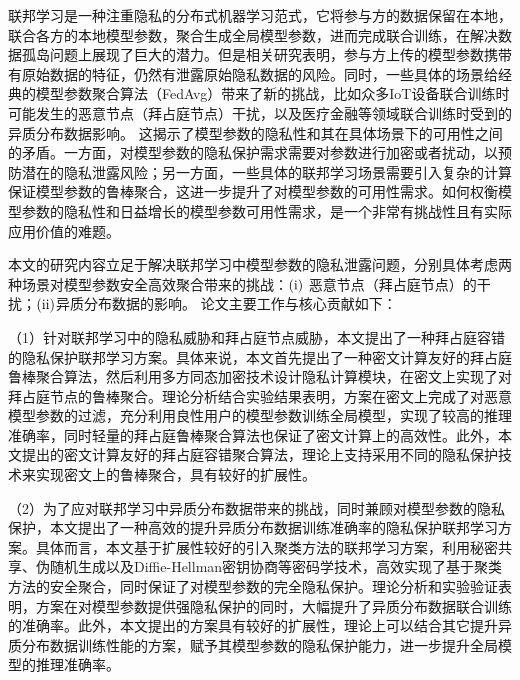 \begin{cabstract}
联邦学习是一种注重隐私的分布式机器学习范式，它将参与方的数据保留在本地，联合各方的本地模型参数，聚合生成全局模型参数，进而完成联合训练，在解决数据孤岛问题上展现了巨大的潜力。但是相关研究表明，参与方上传的模型参数携带有原始数据的特征，仍然有泄露原始隐私数据的风险。同时，一些具体的场景给经典的模型参数聚合算法（FedAvg）带来了新的挑战，比如众多IoT设备联合训练时可能发生的恶意节点（拜占庭节点）干扰，以及医疗金融等领域联合训练时受到的异质分布数据影响。
这揭示了模型参数的隐私性和其在具体场景下的可用性之间的矛盾。一方面，对模型参数的隐私保护需求需要对参数进行加密或者扰动，以预防潜在的隐私泄露风险；另一方面，一些具体的联邦学习场景需要引入复杂的计算保证模型参数的鲁棒聚合，这进一步提升了对模型参数的可用性需求。如何权衡模型参数的隐私性和日益增长的模型参数可用性需求，是一个非常有挑战性且有实际应用价值的难题。

本文的研究内容立足于解决联邦学习中模型参数的隐私泄露问题，分别具体考虑两种场景对模型参数安全高效聚合带来的挑战：$(\rm \romannumeral1)$ 恶意节点（拜占庭节点）的干扰；$(\rm \romannumeral2)$异质分布数据的影响。
论文主要工作与核心贡献如下：

（1）针对联邦学习中的隐私威胁和拜占庭节点威胁，本文提出了一种拜占庭容错的隐私保护联邦学习方案。具体来说，本文首先提出了一种密文计算友好的拜占庭鲁棒聚合算法，然后利用多方同态加密技术设计隐私计算模块，在密文上实现了对拜占庭节点的鲁棒聚合。理论分析结合实验结果表明，方案在密文上完成了对恶意模型参数的过滤，充分利用良性用户的模型参数训练全局模型，实现了较高的推理准确率，同时轻量的拜占庭鲁棒聚合算法也保证了密文计算上的高效性。此外，本文提出的密文计算友好的拜占庭容错聚合算法，理论上支持采用不同的隐私保护技术来实现密文上的鲁棒聚合，具有较好的扩展性。

（2）为了应对联邦学习中异质分布数据带来的挑战，同时兼顾对模型参数的隐私保护，本文提出了一种高效的提升异质分布数据训练准确率的隐私保护联邦学习方案。具体而言，本文基于扩展性较好的引入聚类方法的联邦学习方案，利用秘密共享、伪随机生成以及Diffie-Hellman密钥协商等密码学技术，高效实现了基于聚类方法的安全聚合，同时保证了对模型参数的完全隐私保护。理论分析和实验验证表明，方案在对模型参数提供强隐私保护的同时，大幅提升了异质分布数据联合训练的准确率。此外，本文提出的方案具有较好的扩展性，理论上可以结合其它提升异质分布数据训练性能的方案，赋予其模型参数的隐私保护能力，进一步提升全局模型的推理准确率。


\end{cabstract}
